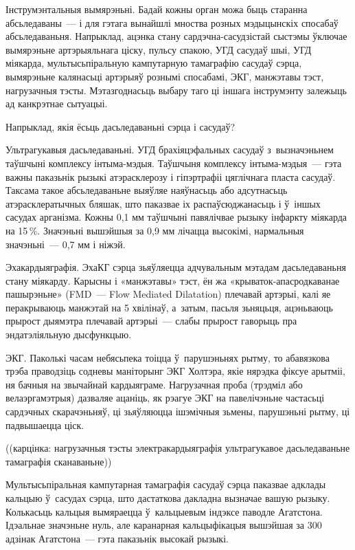 Інструмэнтальныя вымярэньні. Бадай кожны орган можа быць старанна абсьледаваны~--- і для гэтага вынайшлі мноства розных мэдыцынскіх спосабаў абсьледаваньня. Напрыклад, ацэнка стану сардэчна-сасудзістай сыстэмы ўключае вымярэньне артэрыяльнага ціску, пульсу спакою, УГД сасудаў шыі, УГД міякарда, мультысьпіральную кампутарную тамаграфію сасудаў сэрца, вымярэньне калянасьці артэрыяў рознымі спосабамі, ЭКГ, манжэтавы тэст, нагрузачныя тэсты. Мэтазгоднасьць выбару таго ці іншага інструмэнту залежыць ад канкрэтнае сытуацыі.

Напрыклад, якія ёсьць дасьледаваньні сэрца і сасудаў?

Ультрагукавыя дасьледаваньні. УГД брахіяцэфальных сасудаў з~вызначэньнем таўшчыні комплексу інтыма-мэдыя. Таўшчыня комплексу інтыма-мэдыя~--- гэта важны паказьнік рызыкі атэрасклерозу і гіпэртрафіі цяглічнага пласта сасудаў. Таксама такое абсьледаваньне выяўляе наяўнасьць або адсутнасьць атэрасклератычных бляшак, што паказвае іх распаўсюджанасьць і ў~іншых сасудах арганізма. Кожны 0,1 мм таўшчыні павялічвае рызыку інфаркту міякарда на 15\,\%. Значэньні вышэйшыя за 0,9 мм лічацца высокімі, нармальныя значэньні~--- 0,7 мм і ніжэй.

Эхакардыяграфія. ЭхаКГ сэрца зьяўляецца адчувальным мэтадам дасьледаваньня стану міякарду. Карысны і «манжэтавы» тэст, ён жа «крываток-апасродкаванае пашырэньне» (FMD~--- Flow Mediated Dilatation) плечавай артэрыі, калі яе перакрываюць манжэтай на 5 хвілінаў, а~затым, пасьля зьняцьця, ацэньваюць прырост дыямэтра плечавай артэрыі~--- слабы прырост гаворыць пра эндатэліяльную дысфункцыю.

ЭКГ. Паколькі часам небясьпека тоіцца ў~парушэньнях рытму, то абавязкова трэба праводзіць содневы маніторынг ЭКГ Холтэра, якіе нярэдка фіксуе арытміі, ня бачныя на звычайнай кардыяграме. Нагрузачная проба (трэдміл або велаэргамэтрыя) дазваляе ацаніць, як рэагуе ЭКГ на павелічэньне частасьці сардэчных скарачэньняў, ці зьяўляюцца ішэмічныя зьмены, парушэньні рытму, ці падвышаецца ціск.

((карцінка: нагрузачныя тэсты электракардыяграфія ультрагукавое дасьледаваньне тамаграфія сканаваньне))

Мультысьпіральная кампутарная тамаграфія сасудаў сэрца паказвае адклады кальцыю ў~сасудах сэрца, што дастаткова дакладна вызначае вашую рызыку. Колькасьць кальцыя вымяраецца ў~кальцыевым індэксе паводле Агатстона. Ідэальнае значэньне нуль, але каранарная кальцыфікацыя вышэйшая за 300 адзінак Агатстона~--- гэта паказьнік высокай рызыкі.

